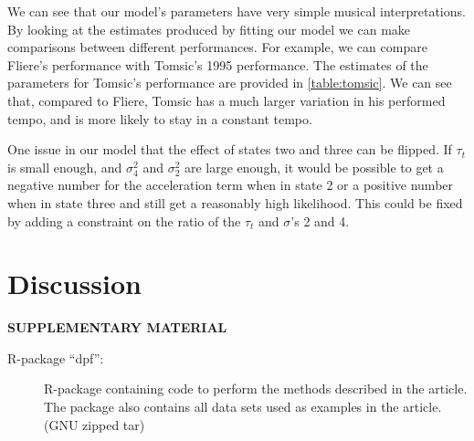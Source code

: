 \documentclass[12pt]{article}
\begin{document}
We can see that our model's parameters have very simple musical interpretations. By looking at the estimates produced by fitting our model we can make comparisons between different performances. For example, we can compare Fliere's performance with Tomsic's 1995 performance. The estimates of the parameters for Tomsic's performance are provided in \autoref{table:tomsic}. We can see that, compared to Fliere, Tomsic has a much larger variation in his performed tempo, and is more likely to stay in a constant tempo.

One issue in our model that the effect of states two and three can be flipped. If $\tau_t$ is small enough, and $\sigma_4^2$ and $\sigma_2^2$ are large enough, it would be possible to get a negative number for the acceleration term when in state 2 or a positive number when in state three and still get a reasonably high likelihood. This could be fixed by adding a constraint on the ratio of the $\tau_t$ and $\sigma$'s 2 and 4.

\section{Discussion}
\label{sec:discussion}




\bigskip
\begin{center}
{\large\bf SUPPLEMENTARY MATERIAL}
\end{center}

\begin{description}

\item[R-package ``dpf'':] R-package containing code to perform the
  methods described in the article. The package also contains all data
  sets used as examples in the article. (GNU zipped tar)

\end{description}






\end{document}
